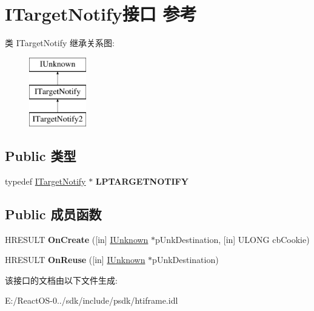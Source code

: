 \hypertarget{interface_i_target_notify}{}\section{I\+Target\+Notify接口 参考}
\label{interface_i_target_notify}
类 I\+Target\+Notify 继承关系图\+:\begin{figure}[H]
\begin{center}
\leavevmode
\includegraphics[height=3.000000cm]{interface_i_target_notify}
\end{center}
\end{figure}
\subsection*{Public 类型}
\begin{DoxyCompactItemize}
\item 
\mbox{\label{interface_i_target_notify_aabc9d8a8fab81c7cece440b5f51bc028}} 
typedef \hyperlink{interface_i_target_notify}{I\+Target\+Notify} $\ast$ {\bfseries L\+P\+T\+A\+R\+G\+E\+T\+N\+O\+T\+I\+FY}
\end{DoxyCompactItemize}
\subsection*{Public 成员函数}
\begin{DoxyCompactItemize}
\item 
\mbox{\label{interface_i_target_notify_ac88128cd5692013898dc31c6b6fb315e}} 
H\+R\+E\+S\+U\+LT {\bfseries On\+Create} (\mbox{[}in\mbox{]} \hyperlink{interface_i_unknown}{I\+Unknown} $\ast$p\+Unk\+Destination, \mbox{[}in\mbox{]} U\+L\+O\+NG cb\+Cookie)
\item 
\mbox{\label{interface_i_target_notify_a2f60f2b68e66c127fb80cfcd748b94a2}} 
H\+R\+E\+S\+U\+LT {\bfseries On\+Reuse} (\mbox{[}in\mbox{]} \hyperlink{interface_i_unknown}{I\+Unknown} $\ast$p\+Unk\+Destination)
\end{DoxyCompactItemize}


该接口的文档由以下文件生成\+:\begin{DoxyCompactItemize}
\item 
E\+:/\+React\+O\+S-\/0../sdk/include/psdk/htiframe.\+idl\end{DoxyCompactItemize}
